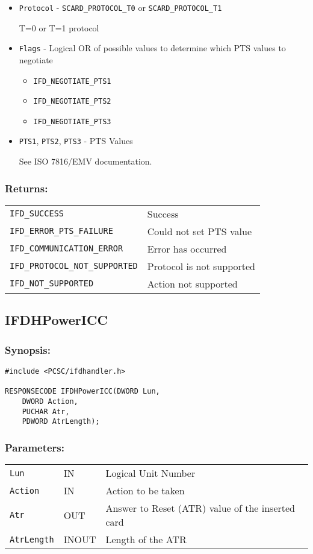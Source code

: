 \documentclass[a4paper,12pt]{article}
\newcommand{\synopsis}{\subsubsection{Synopsis:}}
\newcommand{\parameters}{\subsubsection{Parameters:}}
\newcommand{\returns}{\subsubsection{Returns:}}
\begin{document}
\begin{itemize}
\item \texttt{Protocol} - \texttt{SCARD\_PROTOCOL\_T0} or
\texttt{SCARD\_PROTOCOL\_T1}

T=0 or T=1 protocol

\item \texttt{Flags} - Logical OR of possible values to determine which PTS
values to negotiate

\begin{itemize}
\item \texttt{IFD\_NEGOTIATE\_PTS1}
\item \texttt{IFD\_NEGOTIATE\_PTS2}
\item \texttt{IFD\_NEGOTIATE\_PTS3}
\end{itemize}

\item \texttt{PTS1}, \texttt{PTS2}, \texttt{PTS3} - PTS Values

See ISO 7816/EMV documentation.

\end{itemize}

\returns

\begin{tabular}{ll}
\texttt{IFD\_SUCCESS} & Success\\
\texttt{IFD\_ERROR\_PTS\_FAILURE} & Could not set PTS value\\
\texttt{IFD\_COMMUNICATION\_ERROR} & Error has occurred\\
\texttt{IFD\_PROTOCOL\_NOT\_SUPPORTED} & Protocol is not supported\\
\texttt{IFD\_NOT\_SUPPORTED} & Action not supported\\
\end{tabular}


\subsection{IFDHPowerICC}

\synopsis
\begin{verbatim}
#include <PCSC/ifdhandler.h>

RESPONSECODE IFDHPowerICC(DWORD Lun,
    DWORD Action,
    PUCHAR Atr,
    PDWORD AtrLength);
\end{verbatim}

\parameters

\begin{tabular}{lll}
\texttt{Lun} & IN & Logical Unit Number\\
\texttt{Action} & IN & Action to be taken\\
\texttt{Atr} & OUT & Answer to Reset (ATR) value of the inserted card\\
\texttt{AtrLength} & INOUT & Length of the ATR\\
\end{tabular}
\end{document}

